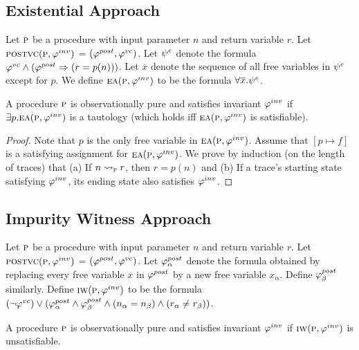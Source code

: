 \subsection{Existential Approach}

Let $\textsc{p}$ be a procedure with input parameter $n$ and return variable $r$.
Let $\textsc{postvc}({\textsc{p}},{\varphi^{inv}})$ = $(\varphi^{post},\varphi^{vc})$.
Let $\psi^e$ denote the formula $\varphi^{vc} \wedge (\varphi^{post} \Rightarrow (r = p(n)))$.
Let $\overline{x}$ denote the sequence of all free variables in $\psi^e$ except for $p$.
We define $\textsc{ea}(\textsc{p},\varphi^{inv})$ to be the formula $ \forall \overline{x}. \psi^e$.

\begin{theorem}
A procedure $\textsc{p}$ is observationally pure and satisfies invariant $\varphi^{inv}$ if
$\exists p. \textsc{ea}(\textsc{p},\varphi^{inv})$ is a tautology
(which holds iff $\textsc{ea}(\textsc{p},\varphi^{inv})$ is satisfiable).
\end{theorem}

\begin{proof}
Note that $p$ is the only free variable in $\textsc{ea}(\textsc{p},\varphi^{inv})$. Assume that $[p \mapsto f]$ is a
satisfying assignment for $\textsc{ea}(\textsc{p},\varphi^{inv})$. We prove by induction (on the length of traces)
that
(a) If $n \rightsquigarrow_{\textsc{p}} r$, then $r = p(n)$ and
(b) If a trace's starting state satisfying $\varphi^{inv}$, its ending state also satisfies $\varphi^{inv}$.
\end{proof}

\subsection{Impurity Witness Approach}

Let $\textsc{p}$ be a procedure with input parameter $n$ and return variable $r$.
Let $\textsc{postvc}({\textsc{p}},{\varphi^{inv}})$ = $(\varphi^{post},\varphi^{vc})$.
Let $\varphi^{post}_\alpha$ denote the formula obtained by replacing every free variable $x$ in $\varphi^{post}$
by a new free variable $x_\alpha$. Define $\varphi^{post}_\beta$ similarly.
Define $\textsc{iw}(\textsc{p}, \varphi^{inv})$ to be the formula $(\neg \varphi^{vc}) \vee (\varphi^{post}_\alpha \wedge \varphi^{post}_\beta \wedge (n_\alpha = n_\beta) \wedge (r_\alpha \neq r_\beta))$.

\begin{theorem}
A procedure $\textsc{p}$ is observationally pure and satisfies invariant $\varphi^{inv}$
if $\textsc{iw}(\textsc{p}, \varphi^{inv})$ is unsatisfiable.
\end{theorem}